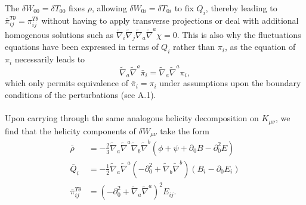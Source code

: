 \documentclass[10pt,letterpaper]{article}
\numberwithin{equation}{subsection}
\begin{document}
The $\delta W_{00} = \delta T_{00}$ fixes $\rho$, allowing $\delta W_{0i} = \delta T_{0i}$ to fix $Q_i$, thereby leading to $\bar\pi_{ij}^{T\theta} = \pi_{ij}^{T\theta}$ without having to apply transverse projections or deal with additional homogenous solutions such as $\tilde\nabla_i\tilde\nabla_j \tilde\nabla_a\tilde\nabla^a \chi = 0$. This is also why the fluctuations equations have been expressed in terms of $Q_i$ rather than $\pi_i$, as the equation of $\pi_i$ necessarily leads to 
\begin{equation}
\tilde\nabla_a\tilde\nabla^a \bar \pi_i = \tilde\nabla_a \tilde\nabla^a \pi_i,
\end{equation}
which only permits equivalence of $\bar\pi_i = \pi_i$ under assumptions upon the boundary conditions of the perturbations (see A.1). 
\\ \\
Upon carrying through the same analogous helicity decomposition on $K_{\mu\nu}$, we find that the helicity components of $\delta W_{\mu\nu}$ take the form
\begin{align}
\bar \rho &= -\frac{2}{3} \tilde{\nabla}_a\tilde{\nabla}^a\tilde{\nabla}_b\tilde{\nabla}^b (\phi + \psi +\partial_0{B}-\partial_0^2{E}) 
\nonumber\\
\bar Q_i &= -\frac{1}{2} \tilde{\nabla}_a\tilde{\nabla}^a\left(-\partial_0^2+\tilde{\nabla}_b\tilde{\nabla}^b\right)(B_i - \partial_0{E}_i)
\nonumber \\
\bar \pi_{ij}^{T\theta} &= \left(-\partial_0^2 + \tilde\nabla_a\tilde\nabla^a\right)^2 E_{ij}.
\end{align}
\end{document}
